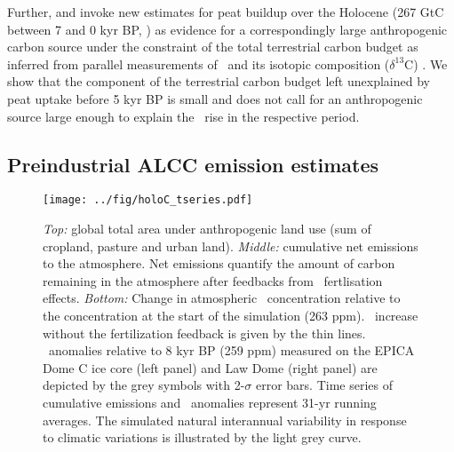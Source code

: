 Further, \citet{ruddiman11hol} and \citet{ruddiman13} invoke new estimates for peat buildup over the Holocene (267 GtC between 7 and 0 kyr BP, \citet{yu11hol}) as evidence for a correspondingly large anthropogenic carbon source under the constraint of the total terrestrial carbon budget as inferred from parallel measurements of \coo\ and its isotopic composition ($\delta^{13}$C) \citep{elsig}. We show that the component of the terrestrial carbon budget left unexplained by peat uptake before 5 kyr BP is small and does not call for an anthropogenic source large enough to explain the \coo\ rise in the respective period.


\subsection*{Preindustrial ALCC emission estimates}
\begin{figure}
\begin{center}
  \texttt{[image: ../fig/holoC\_tseries.pdf]}
\end{center}
  \caption[Time series of total land use area, cumulative C emissions, and atmospheric \coo\ in Holocene land use simulations]{{\it Top:} global total area under anthropogenic land use (sum of cropland, pasture and urban land). {\it Middle:} cumulative net emissions to the atmosphere. Net emissions quantify the amount of carbon remaining in the atmosphere after feedbacks from \coo\ fertlisation effects. {\it Bottom:} Change in atmospheric \coo\ concentration relative to the concentration at the start of the simulation (263 ppm). \coo\ increase without the fertilization feedback is given by the thin lines. \coo\ anomalies relative to 8 kyr BP (259 ppm) measured on the EPICA Dome C ice core \citep{monnin2001sci} (left panel) and Law Dome \citep{etheridge96jgr} (right panel) are depicted by the grey symbols with 2-$\sigma$ error bars. Time series of cumulative emissions and \coo\ anomalies represent 31-yr running averages. The simulated natural interannual variability in response to climatic variations is illustrated by the light grey curve.}
\label{fig:holoC_tseries}
\end{figure}

